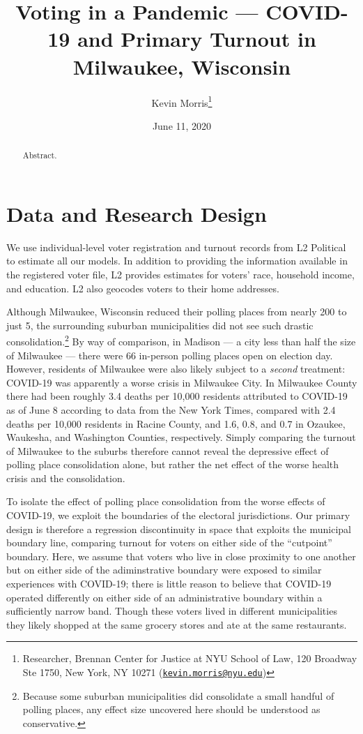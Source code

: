 \documentclass[
  12pt,
]{article}
\title{Voting in a Pandemic --- COVID-19 and Primary Turnout in Milwaukee, Wisconsin}
\author{Kevin Morris\footnote{Researcher, Brennan Center for Justice at NYU School of Law, 120 Broadway Ste 1750, New York, NY 10271 (\href{mailto:kevin.morris@nyu.edu}{\nolinkurl{kevin.morris@nyu.edu}})}}
\date{June 11, 2020}
\begin{document}
\maketitle
\begin{abstract}
Abstract.
\end{abstract}

\pagebreak

\doublespacing

\hypertarget{data-and-research-design}{%
\section*{Data and Research Design}\label{data-and-research-design}}

We use individual-level voter registration and turnout records from L2 Political to estimate all our models. In addition to providing the information available in the registered voter file, L2 provides estimates for voters' race, household income, and education. L2 also geocodes voters to their home addresses.

Although Milwaukee, Wisconsin reduced their polling places from nearly 200 to just 5, the surrounding suburban municipalities did not see such drastic consolidation.\footnote{Because some suburban municipalities did consolidate a small handful of polling places, any effect size uncovered here should be understood as conservative.} By way of comparison, in Madison --- a city less than half the size of Milwaukee --- there were 66 in-person polling places open on election day. However, residents of Milwaukee were also likely subject to a \emph{second} treatment: COVID-19 was apparently a worse crisis in Milwaukee City. In Milwaukee County there had been roughly 3.4 deaths per 10,000 residents attributed to COVID-19 as of June 8 according to data from the New York Times, compared with 2.4 deaths per 10,000 residents in Racine County, and 1.6, 0.8, and 0.7 in Ozaukee, Waukesha, and Washington Counties, respectively. Simply comparing the turnout of Milwaukee to the suburbs therefore cannot reveal the depressive effect of polling place consolidation alone, but rather the net effect of the worse health crisis and the consolidation.

To isolate the effect of polling place consolidation from the worse effects of COVID-19, we exploit the boundaries of the electoral jurisdictions. Our primary design is therefore a regression discontinuity in space that exploits the municipal boundary line, comparing turnout for voters on either side of the ``cutpoint'' boundary. Here, we assume that voters who live in close proximity to one another but on either side of the adiminstrative boundary were exposed to similar experiences with COVID-19; there is little reason to believe that COVID-19 operated differently on either side of an administrative boundary within a sufficiently narrow band. Though these voters lived in different municipalities they likely shopped at the same grocery stores and ate at the same restaurants.
\end{document}
